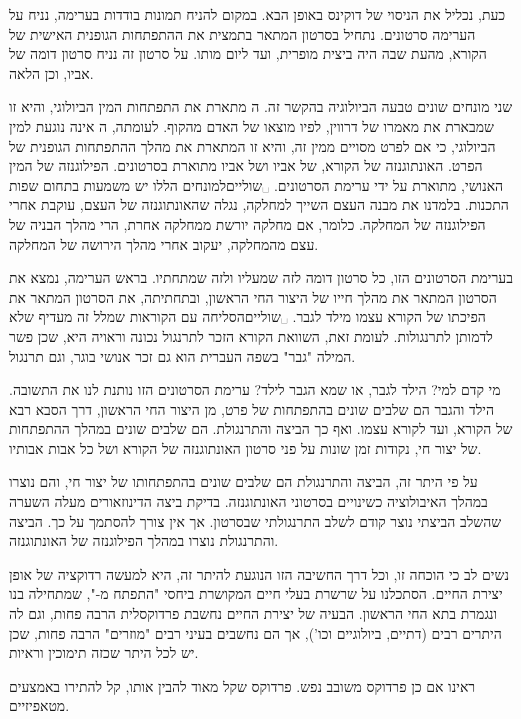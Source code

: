 \begin{enumerate}
כעת, נכליל את הניסוי של דוקינס באופן הבא. במקום להניח תמונות בודדות בערימה,
נניח על הערימה סרטונים. נתחיל בסרטון המתאר בתמצית את ההתפתחות הגופנית האישית של
הקורא, מהעת שבה היה ביצית מופרית, ועד ליום מותו. על סרטון זה נניח סרטון דומה של
אביו, וכן הלאה.

שני מונחים שונים טבעה הביולוגיה בהקשר זה. ה מתארת את התפתחות
המין הביולוגי, והיא זו שמבארת את מאמרו של דרווין, לפיו מוצאו של האדם מהקוף.
לעומתה, ה אינה נוגעת למין הביולוגי, כי אם לפרט מסויים ממין זה,
והיא זו המתארת את מהלך ההתפתחות הגופנית של הפרט. האונתוגנזה של הקורא, של אביו
ושל אביו מתוארת בסרטונים. הפילוגנזה של המין האנושי, מתוארת על ידי ערימת
הסרטונים. ␣שוליים{למונחים הללו יש משמעות בתחום שפות התכנות. בלמדנו את מבנה
העצם השייך למחלקה, נגלה שהאונתוגנזה של העצם, עוקבת אחרי הפילוגנזה של המחלקה.
כלומר, אם מחלקה יורשת ממחלקה אחרת, הרי מהלך הבניה של עצם מהמחלקה, יעקוב אחרי
מהלך הירושה של המחלקה.}

בערימת הסרטונים הזו, כל סרטון דומה לזה שמעליו ולזה שמתחתיו. בראש הערימה, נמצא
את הסרטון המתאר את מהלך חייו של היצור החי הראשון, ובתחתיתה, את הסרטון המתאר את
הפיכתו של הקורא עצמו מילד לגבר. ␣שוליים{הסליחה עם הקוראות שמלל זה מעדיף
שלא לדמותן לתרנגולות. לעומת זאת, השוואת הקורא הזכר לתרנגול נכונה וראויה היא,
שכן פשר המילה "גבר" בשפה העברית הוא גם זכר אנושי בוגר, וגם תרנגול.}

מי קדם למי? הילד לגבר, או שמא הגבר לילד? ערימת הסרטונים הזו נותנת לנו את
התשובה. הילד והגבר הם שלבים שונים בהתפתחות של פרט, מן היצור החי הראשון, דרך
הסבא רבא של הקורא, ועד לקורא עצמו. ואף כך הביצה והתרנגולת. הם שלבים שונים במהלך
ההתפתחות של יצור חי, נקודות זמן שונות על פני סרטון האונתוגנזה של הקורא ושל כל
אבות אבותיו.

על פי היתר זה, הביצה והתרנגולת הם שלבים שונים בהתפתחותו של יצור חי, והם נוצרו
במהלך האיבולוציה כשינויים בסרטוני האונתוגנזה. בדיקת ביצה הדינוזאורים מעלה השערה
שהשלב הביצתי נוצר קודם לשלב התרנגולתי שבסרטון. אך אין צורך להסתמך על כך. הביצה
והתרנגולת נוצרו במהלך הפילוגנזה של האונתוגנזה.

נשים לב כי הוכחה זו, וכל דרך החשיבה הזו הנוגעת להיתר זה, היא למעשה 
{רדוקציה} של אופן יצירת החיים. הסתכלנו על שרשרת בעלי חיים המקושרת ביחסי "התפתח
מ-", שמתחילה בנו ונגמרת בתא החי הראשון. הבעיה של יצירת החיים נחשבת פרדוקסלית
הרבה פחות, וגם לה היתרים רבים (דתיים, ביולוגיים וכו'), אך הם נחשבים בעיני רבים
"מוזרים" הרבה פחות, שכן יש לכל היתר שכזה תימוכין וראיות. \end{enumerate}
ראינו אם כן פרדוקס משובב נפש. פרדוקס שקל מאוד להבין אותו, קל להתירו באמצעים מטאפיזיים.

